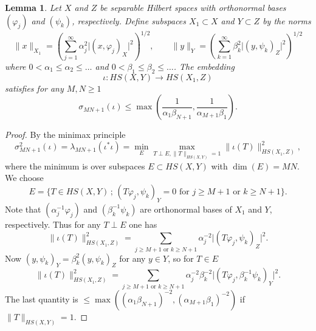 \documentclass[12pt,twoside]{amsart}
\numberwithin{equation}{section}
\renewcommand{\leq}{\leqslant}
\renewcommand{\geq}{\geqslant}
\newtheorem{lemma}[theorem]{Lemma}
\newcommand{\abs}[1]{\lvert #1 \rvert}          %
\newcommand{\norm}[1]{\lVert #1 \rVert}         %
\begin{document}
\begin{lemma} \label{lemma_hs_embedding}
Let $X$ and $Z$ be separable Hilbert spaces with orthonormal bases $(\varphi_j)$ and $(\psi_k)$, respectively. Define subspaces $X_1 \subset X$ and $Y \subset Z$ by the norms 
\[
\norm{x}_{X_1} = ( \sum_{j=1}^{\infty} \alpha_j^2 \abs{(x, \varphi_j)_X}^2 )^{1/2}, \qquad \norm{y}_{Y} = ( \sum_{k=1}^{\infty} \beta_k^2 \abs{(y, \psi_k)_Z}^2 )^{1/2}
\]
where $0 < \alpha_1 \leq \alpha_2 \leq \ldots$ and $0 < \beta_1 \leq \beta_2 \leq \ldots$. The embedding 
\[
\iota: HS(X,Y) \to HS(X_1, Z)
\]
satisfies for any $M, N \geq 1$ 
\[
\sigma_{MN+1}(\iota) \leq \max(\frac{1}{\alpha_1 \beta_{N+1}}, \frac{1}{\alpha_{M+1} \beta_1}).
\]
\end{lemma}
\begin{proof}
By the minimax principle 
\[
\sigma_{MN+1}^2(\iota) = \lambda_{MN+1}(\iota^* \iota) = \min_{E} \max_{T \perp E, \norm{T}_{HS(X,Y)}=1} \norm{\iota(T)}_{HS(X_1,Z)}^2,
\]
where the minimum is over subspaces $E \subset HS(X,Y)$ with $\dim(E) = MN$. We choose 
\[
E = \{ T \in HS(X,Y) \,;\, (T\varphi_j, \psi_k)_Y = 0 \text{ for } j \geq M+1 \text{ or } k \geq N+1 \}.
\]
Note that $(\alpha_j^{-1} \varphi_j)$ and $(\beta_k^{-1} \psi_k)$ are orthonormal bases of $X_1$ and $Y$, respectively. Thus for any $T \perp E$ one has 
\[
\norm{\iota(T)}_{HS(X_1,Z)}^2 = \sum_{j \geq M+1 \text{ or } k \geq N+1} \alpha_j^{-2} \abs{(T \varphi_j, \psi_k)_Z}^2.
\]
Now $(y,\psi_k)_Y = \beta_k^2 (y,\psi_k)_Z$ for any $y \in Y$, so for $T \in E$ 
\[
\norm{\iota(T)}_{HS(X_1,Z)}^2 = \sum_{j \geq M+1 \text{ or } k \geq N+1} \alpha_j^{-2} \beta_k^{-2} \abs{(T \varphi_j, \beta_k^{-1} \psi_k)_Y}^2.
\]
The last quantity is $\leq \max((\alpha_1 \beta_{N+1})^{-2}, (\alpha_{M+1} \beta_1)^{-2})$ if $\norm{T}_{HS(X,Y)} = 1$.
\end{proof}
\end{document}
